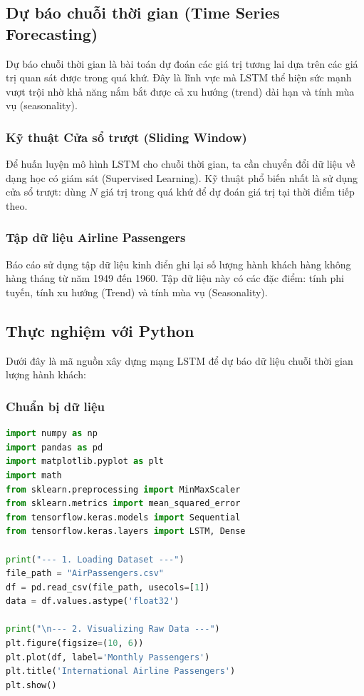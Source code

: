 \subsection{Dự báo chuỗi thời gian (Time Series Forecasting)}
Dự báo chuỗi thời gian là bài toán dự đoán các giá trị tương lai dựa trên các giá trị quan sát được trong quá khứ. Đây là lĩnh vực mà LSTM thể hiện sức mạnh vượt trội nhờ khả năng nắm bắt được cả xu hướng (trend) dài hạn và tính mùa vụ (seasonality).

\subsubsection{Kỹ thuật Cửa sổ trượt (Sliding Window)}
Để huấn luyện mô hình LSTM cho chuỗi thời gian, ta cần chuyển đổi dữ liệu về dạng học có giám sát (Supervised Learning). Kỹ thuật phổ biến nhất là sử dụng cửa sổ trượt: dùng $N$ giá trị trong quá khứ để dự đoán giá trị tại thời điểm tiếp theo.

\subsubsection{Tập dữ liệu Airline Passengers}
Báo cáo sử dụng tập dữ liệu kinh điển ghi lại số lượng hành khách hàng không hàng tháng từ năm 1949 đến 1960. Tập dữ liệu này có các đặc điểm: tính phi tuyến, tính xu hướng (Trend) và tính mùa vụ (Seasonality).

\subsection{Thực nghiệm với Python}
Dưới đây là mã nguồn xây dựng mạng LSTM để dự báo dữ liệu chuỗi thời gian lượng hành khách:

\subsubsection{Chuẩn bị dữ liệu}
\begin{lstlisting}[language=Python]
import numpy as np
import pandas as pd
import matplotlib.pyplot as plt
import math
from sklearn.preprocessing import MinMaxScaler
from sklearn.metrics import mean_squared_error
from tensorflow.keras.models import Sequential
from tensorflow.keras.layers import LSTM, Dense

print("--- 1. Loading Dataset ---")
file_path = "AirPassengers.csv"
df = pd.read_csv(file_path, usecols=[1])
data = df.values.astype('float32')

print("\n--- 2. Visualizing Raw Data ---")
plt.figure(figsize=(10, 6))
plt.plot(df, label='Monthly Passengers')
plt.title('International Airline Passengers')
plt.show()
\end{lstlisting}

